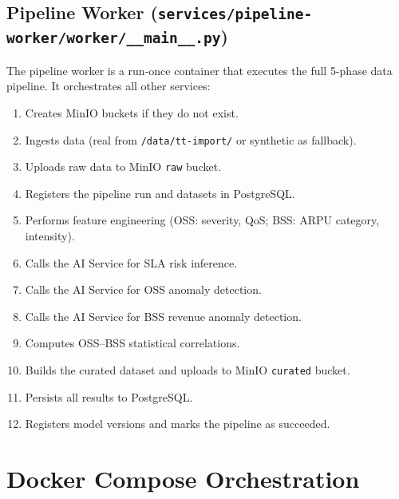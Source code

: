 \subsection{Pipeline Worker (\texttt{services/pipeline-worker/worker/\_\_main\_\_.py})}

The pipeline worker is a run-once container that executes the full 5-phase data pipeline. It orchestrates all other services:

\begin{enumerate}
  \item Creates MinIO buckets if they do not exist.
  \item Ingests data (real from \texttt{/data/tt-import/} or synthetic as fallback).
  \item Uploads raw data to MinIO \texttt{raw} bucket.
  \item Registers the pipeline run and datasets in PostgreSQL.
  \item Performs feature engineering (OSS: severity, QoS; BSS: ARPU category, intensity).
  \item Calls the AI Service for SLA risk inference.
  \item Calls the AI Service for OSS anomaly detection.
  \item Calls the AI Service for BSS revenue anomaly detection.
  \item Computes OSS--BSS statistical correlations.
  \item Builds the curated dataset and uploads to MinIO \texttt{curated} bucket.
  \item Persists all results to PostgreSQL.
  \item Registers model versions and marks the pipeline as succeeded.
\end{enumerate}

\section{Docker Compose Orchestration}

